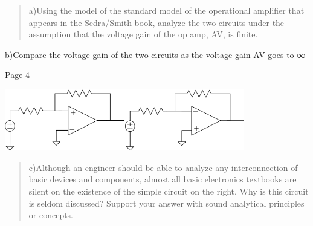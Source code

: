\documentclass[10pt,a4paper]{article}
\begin{document}
\begin{quote}
a)Using the model of the standard model of the operational amplifier
that appears in the Sedra/Smith book, analyze the two circuits under the
assumption that the voltage gain of the op amp, AV, is finite.
\end{quote}

b)Compare the voltage gain of the two circuits as the voltage gain AV
goes to ∞

Page 4

\includegraphics[width=2.06944in,height=1.05556in]{vertopal_3376d9a0695b4078a59040ba2f51c60d/media/image8.png}\includegraphics[width=2.05556in,height=1.05556in]{vertopal_3376d9a0695b4078a59040ba2f51c60d/media/image9.png}

\begin{quote}
c)Although an engineer should be able to analyze any interconnection of
basic devices and components, almost all basic electronics textbooks are
silent on the existence of the simple circuit on the right. Why is this
circuit is seldom discussed? Support your answer with sound analytical
principles or concepts.
\end{quote}
\end{document}
